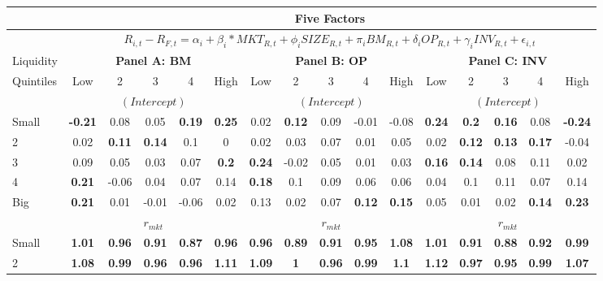 \begin{table}[H]
\tiny
\centering
\begin{tabular}{lccccc|ccccc|ccccc}
\hline
& \multicolumn{15}{c}{Five Factors} \\ \hline
& \multicolumn{15}{c}{\tiny $R_{i,t} - R_{F,t} = \alpha_i+\beta_i*MKT_{R,t} + \phi_iSIZE_{R,t}+\pi_iBM_{R,t} + \delta_iOP_{R,t}+\gamma_iINV_{R,t} + \epsilon_{i,t}$} \\ \hline
Liquidity & \multicolumn{5}{c|}{\textbf{Panel A: BM}} & \multicolumn{5}{c|}{\textbf{Panel B: OP}} & \multicolumn{5}{c}{\textbf{Panel C: INV}} \\
Quintiles & Low & 2 & 3 & 4 & High & Low & 2 & 3 & 4 & High & Low & 2 & 3 & 4 & High \\  \hline
 & \multicolumn{5}{c|}{$(Intercept)$} & \multicolumn{5}{c|}{$(Intercept)$} & \multicolumn{5}{c}{$(Intercept)$} \\
Small & \textbf{-0.21} & 0.08 & 0.05 & \textbf{0.19} & \textbf{0.25} & 0.02 & \textbf{0.12} & 0.09 & -0.01 & -0.08 & \textbf{0.24} & \textbf{0.2} & \textbf{0.16} & 0.08 & \textbf{-0.24} \\
2 & 0.02 & \textbf{0.11} & \textbf{0.14} & 0.1 & 0 & 0.02 & 0.03 & 0.07 & 0.01 & 0.05 & 0.02 & \textbf{0.12} & \textbf{0.13} & \textbf{0.17} & -0.04 \\
3 & 0.09 & 0.05 & 0.03 & 0.07 & \textbf{0.2} & \textbf{0.24} & -0.02 & 0.05 & 0.01 & 0.03 & \textbf{0.16} & \textbf{0.14} & 0.08 & 0.11 & 0.02 \\
4 & \textbf{0.21} & -0.06 & 0.04 & 0.07 & 0.14 & \textbf{0.18} & 0.1 & 0.09 & 0.06 & 0.06 & 0.04 & 0.1 & 0.11 & 0.07 & 0.14 \\
Big & \textbf{0.21} & 0.01 & -0.01 & -0.06 & 0.02 & 0.13 & 0.02 & 0.07 & \textbf{0.12} & \textbf{0.15} & 0.05 & 0.01 & 0.02 & \textbf{0.14} & \textbf{0.23} \\
 & \multicolumn{5}{c|}{$r_{mkt}$} & \multicolumn{5}{c|}{$r_{mkt}$} & \multicolumn{5}{c}{$r_{mkt}$} \\
Small & \textbf{1.01} & \textbf{0.96} & \textbf{0.91} & \textbf{0.87} & \textbf{0.96} & \textbf{0.96} & \textbf{0.89} & \textbf{0.91} & \textbf{0.95} & \textbf{1.08} & \textbf{1.01} & \textbf{0.91} & \textbf{0.88} & \textbf{0.92} & \textbf{0.99} \\
2 & \textbf{1.08} & \textbf{0.99} & \textbf{0.96} & \textbf{0.96} & \textbf{1.11} & \textbf{1.09} & \textbf{1} & \textbf{0.96} & \textbf{0.99} & \textbf{1.1} & \textbf{1.12} & \textbf{0.97} & \textbf{0.95} & \textbf{0.99} & \textbf{1.07} \\

\end{tabular}
\end{table}
